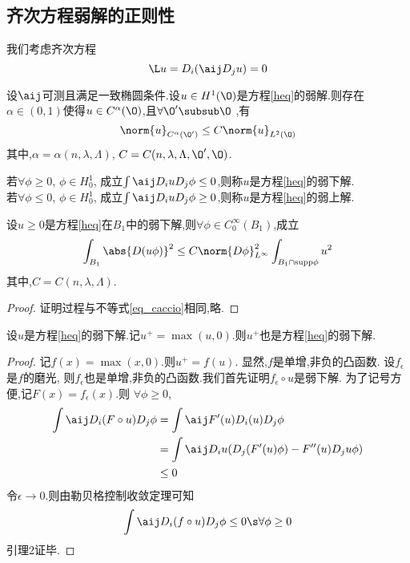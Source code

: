 \subsection{齐次方程弱解的\texorpdfstring{\Holder}{Holder}正则性}
我们考虑齐次方程
\begin{equation} \label{heq}
    \L u= D_i(\aij D_j u)=0
\end{equation}
\begin{theorem} \label{hholder}
    设$\aij$可测且满足一致椭圆条件.设$u \in H^1(\O)$是方程\eqref{heq}的弱解.则存在$\alpha \in (0,1)$使得$u \in C^\alpha(\O)$,且$\forall \O' \subsub \O$ ,有
    \begin{equation}
        \norm{u}_{C^\alpha(\O')} \le C\norm{u}_{L^2(\O)}
    \end{equation}
    其中,$\alpha=\alpha(n,\lambda,\Lambda)$, $C=C(n,\lambda,\Lambda,\O',\O)$.
\end{theorem}
\begin{definition}
    若$\forall \phi \ge 0$, $\phi \in H^1_0$, 成立$\int \aij D_iu D_j \phi \le 0$,则称$u$是方程\eqref{heq}的弱下解. \\
    若$\forall \phi \le 0$, $\phi \in H^1_0$, 成立$\int \aij D_iu D_j \phi \ge 0$,则称$u$是方程\eqref{heq}的弱上解.
\end{definition}
\begin{lemma}[Caccioppoli不等式]\label{caccioppoli}
    设$u \ge 0$是方程\eqref{heq}在$B_1$中的弱下解,则$\forall \phi \in C^\infty_0(B_1)$,成立
    \begin{equation}
        \int_{B_1}\abs{D(u\phi)}^2 \le C\norm{D\phi}^2_{L^\infty}\int_{B_1 \cap \text{supp}\phi}u^2
    \end{equation}
    其中,$C=C(n,\lambda,\Lambda)$.
\end{lemma}
\begin{proof}
    证明过程与不等式\eqref{eq_caccio}相同,略.
\end{proof}
\begin{lemma}
    设$u$是方程\eqref{heq}的弱下解.记$u^+=\max(u,0)$.则$u^+$也是方程\eqref{heq}的弱下解.
\end{lemma}
\begin{proof}
    记$f(x)=\max(x,0)$.则$u^+=f(u)$. 显然,$f$是单增,非负的凸函数. 设$f_\epsilon$是$f$的磨光, 则$f_\epsilon$也是单增,非负的凸函数.我们首先证明$f_\epsilon \circ u$是弱下解. 为了记号方便,记$F(x)=f_\epsilon(x)$.则 $\forall \phi \ge 0$,
    \begin{equation}
        \begin{split}
            \int \aij D_i(F\circ u) D_j \phi 
            &= \int \aij F'(u)D_i(u)D_j\phi\\
            &=\int \aij D_iu(D_j(F'(u)\phi)-F''(u)D_ju\phi)\\
            &\le 0
        \end{split}
    \end{equation}
    令$\epsilon \to 0$.则由勒贝格控制收敛定理可知
    \begin{equation}
        \int \aij D_i(f\circ u) D_j\phi \le 0 \s \forall \phi \ge 0
    \end{equation}
    引理2证毕.
\end{proof}
